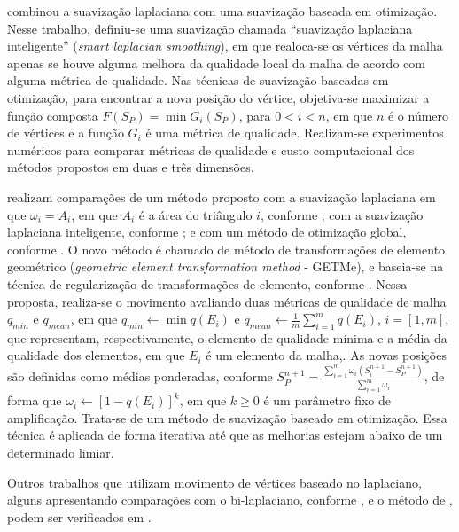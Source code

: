  combinou a suavização laplaciana com uma suavização baseada em otimização. Nesse trabalho, definiu-se uma suavização chamada ``suavização laplaciana inteligente'' ({\it smart laplacian smoothing}), em que realoca-se os vértices da malha apenas se houve alguma melhora da qualidade local da malha de acordo com alguma métrica de qualidade. Nas técnicas de suavização baseadas em otimização, para encontrar a nova posição do vértice, objetiva-se maximizar a função composta $F(S_{P}) = \min G_i(S_{P})$, para $0<i<n$, em que $n$ é o número de vértices e a função $G_i$ é uma métrica de qualidade. Realizam-se experimentos numéricos para comparar métricas de qualidade e custo computacional dos métodos propostos em duas e três dimensões.

 realizam comparações de um método proposto com a suavização laplaciana em que $\omega_i = A_i$, em que $A_i$ é a área do triângulo $i$, conforme ; com a suavização laplaciana inteligente, conforme ; e com um método de otimização global, conforme . O novo  método é chamado de método de transformações de elemento geométrico ({\it geometric element transformation method} - GETMe), e baseia-se na técnica de regularização de transformações de elemento, conforme . Nessa proposta, realiza-se o movimento avaliando duas métricas de qualidade de malha $q_{min}$ e $q_{mean}$, em que $q_{min} \leftarrow \min q(E_{i})$ e $q_{mean} \leftarrow \frac{1}{m} \sum_{i=1}^{m}q(E_{i})$, $i = [1,m]$, que representam, respectivamente, o elemento de qualidade mínima e a média da qualidade dos elementos, em que $E_{i}$ é um elemento da malha,. As novas posições são definidas como médias ponderadas, conforme  $S_{P}^{n+1} = \frac{ \sum_{i=1}^{m} \omega_{i}(S_{i}^{n+1} - S_{P}^{n+1}) } { \sum_{i=1}^{m} \omega_{i} }$, de forma que $\omega_{i} \leftarrow [1 - q(E_{i})]^k$, em que $k \geq 0$ é um parâmetro fixo de amplificação. Trata-se de um método de suavização baseado em otimização. Essa técnica é aplicada de forma iterativa até que as melhorias estejam abaixo de um determinado limiar.

Outros trabalhos que utilizam movimento de vértices baseado no laplaciano, alguns apresentando comparações com  o bi-laplaciano, conforme , e o método de , podem ser verificados em .

